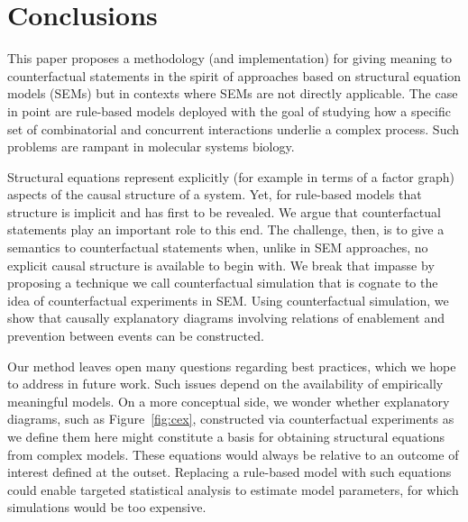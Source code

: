 \section*{Conclusions}

This paper proposes a methodology (and implementation) for giving meaning to counterfactual statements in the spirit of approaches based on structural equation models (SEMs) but in contexts where SEMs are not directly applicable. The case in point are rule-based models deployed with the goal of studying how a specific set of combinatorial and concurrent interactions underlie a complex process. Such problems are rampant in molecular systems biology. 

Structural equations represent explicitly (for example in terms of a
factor graph) aspects of the causal structure of a system. Yet, for
rule-based models that structure is implicit and has first to be
revealed. We argue that counterfactual statements play an important
role to this end. The challenge, then, is to give a semantics to
counterfactual statements when, unlike in SEM approaches, no explicit
causal structure is available to begin with. We break that impasse by
proposing a technique we call counterfactual simulation that is
cognate to the idea of counterfactual experiments in SEM. Using
counterfactual simulation, we show that causally explanatory diagrams
involving relations of enablement and prevention between events can be
constructed.

Our method leaves open many questions regarding best practices, which
we hope to address in future work. Such issues depend on the
availability of empirically meaningful models. On a more conceptual
side, we wonder whether explanatory diagrams, such as
Figure~\ref{fig:cex}, constructed via counterfactual experiments as we
define them here might constitute a basis for obtaining structural
equations from complex models. These equations would always be
relative to an outcome of interest defined at the outset. Replacing a
rule-based model with such equations could enable targeted statistical
analysis to estimate model parameters, for which simulations would be
too expensive.
